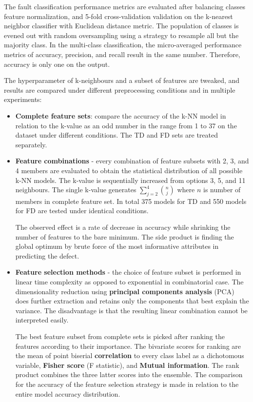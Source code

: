 The fault classification performance metrics are evaluated after balancing classes feature normalization, and 5-fold cross-validation validation on the k-nearest neighbor classifier with Euclidean distance metric. The population of classes is evened out with random oversampling using a strategy to resample all but the majority class. In the multi-class classification, the micro-averaged performance metrics of accuracy, precision, and recall result in the same number. Therefore, accuracy is only one on the output. 

The hyperparameter of k-neighbours and a subset of features are tweaked, and results are compared under different preprocessing conditions and in multiple experiments:

\begin{itemize}
\itemsep0pt
\item \textbf{Complete feature sets}: compare the accuracy of the k-NN model in relation to the k-value as an odd number in the range from 1 to 37 on the dataset under different conditions. The TD and FD sets are treated separately.

\item \textbf{Feature combinations} - every combination of feature subsets with 2, 3, and 4 members are evaluated to obtain the statistical distribution of all possible k-NN models. The k-value is sequentially increased from options 3, 5, and 11 neighbours. The single k-value generates $\sum_{j=2}^{4}{\binom{n}{j}}$ where $n$ is number of members in complete feature set. In total 375 models for TD and 550 models for FD are tested under identical conditions. 

The observed effect is a rate of decrease in accuracy while shrinking the number of features to the bare minimum. The side product is finding the global optimum by brute force of the most informative attributes in predicting the defect.

\item \textbf{Feature selection methods} - the choice of feature subset is performed in linear time complexity as opposed to exponential in combinatorial case. The dimensionality reduction using \textbf{principal components analysis} (PCA) does further extraction and retains only the components that best explain the variance. The disadvantage is that the resulting linear combination cannot be interpreted easily. 

The best feature subset from complete sets is picked after ranking the features according to their importance. The bivariate scores for ranking are the mean of point biserial \textbf{correlation} to every class label as a dichotomous variable, \textbf{Fisher score} (F statistic), and \textbf{Mutual information}. The rank product combines the three latter scores into the ensemble. The comparison for the accuracy of the feature selection strategy is made in relation to the entire model accuracy distribution. 


\end{itemize}

